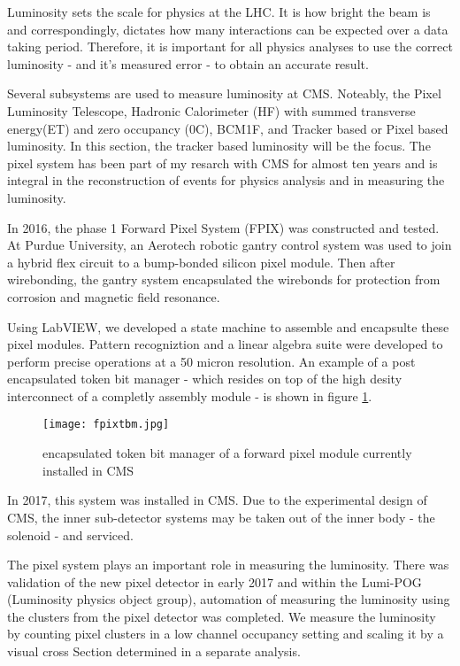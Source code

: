 Luminosity sets the scale for physics at the LHC. It is how bright the beam is and correspondingly, dictates how many interactions can be expected over a data taking period. Therefore, it is important for all physics analyses to use the correct luminosity - and it's measured error - to obtain an accurate result.  

Several subsystems are used to measure luminosity at CMS. Noteably, the Pixel Luminosity Telescope, Hadronic Calorimeter (HF) with summed transverse energy(ET) and zero occupancy (0C), BCM1F, and Tracker based or Pixel based luminosity.
In this section, the tracker based luminosity will be the focus. The pixel system has been part of my resarch with CMS for almost ten years and is integral in the reconstruction of events for physics analysis and in measuring the luminosity.

In 2016, the phase 1 Forward Pixel System (FPIX) was constructed and tested. At Purdue University, an Aerotech robotic gantry control system was used to join a hybrid flex circuit to a bump-bonded silicon pixel module. Then after wirebonding, the gantry system encapsulated the wirebonds for protection from corrosion and magnetic field resonance. 

Using LabVIEW, we developed a state machine to assemble and encapsulte these pixel modules. Pattern recogniztion and a linear algebra suite were developed to perform precise operations at a 50 micron resolution. An example of a post encapsulated token bit manager - which resides on top of the high desity interconnect of a completly assembly module - is shown in figure \ref{fig:tbm}.

\begin{figure}[ht!b]
    \centering
  \texttt{[image: fpixtbm.jpg]}
    \caption{\label{fig:tbm} encapsulated token bit manager of a forward pixel module currently installed in CMS}
\end{figure}


In 2017, this system was installed in CMS. Due to the experimental design of CMS, the inner sub-detector systems may be taken out of the inner body - the solenoid - and serviced. 

The pixel system plays an important role in measuring the luminosity. There was validation of the new pixel detector in early 2017 and within the Lumi-POG (Luminosity physics object group), automation of measuring the luminosity using the clusters from the pixel detector was completed. 
We measure the luminosity by counting pixel clusters in a low channel occupancy setting and scaling it by a visual cross Section determined in a separate analysis.

